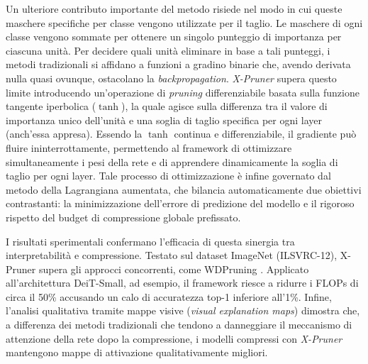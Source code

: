 Un ulteriore contributo importante del metodo risiede nel modo in cui queste maschere specifiche per classe vengono utilizzate per il taglio. Le maschere di ogni classe vengono sommate per ottenere un singolo punteggio di importanza per ciascuna unità. Per decidere quali unità eliminare in base a tali punteggi, i metodi tradizionali si affidano a funzioni a gradino binarie che, avendo derivata nulla quasi ovunque, ostacolano la \textit{backpropagation}. \textit{X-Pruner} supera questo limite introducendo un'operazione di \textit{pruning} differenziabile basata sulla funzione tangente iperbolica ($\tanh$), la quale agisce sulla differenza tra il valore di importanza unico dell'unità e una soglia di taglio specifica per ogni layer (anch'essa appresa). Essendo la $\tanh$ continua e differenziabile, il gradiente può fluire ininterrottamente, permettendo al framework di ottimizzare simultaneamente i pesi della rete e di apprendere dinamicamente la soglia di taglio per ogni layer. Tale processo di ottimizzazione è infine governato dal metodo della Lagrangiana aumentata, che bilancia automaticamente due obiettivi contrastanti: la minimizzazione dell'errore di predizione del modello e il rigoroso rispetto del budget di compressione globale prefissato. \par
I risultati sperimentali confermano l'efficacia di questa sinergia tra interpretabilità e compressione. Testato sul dataset ImageNet (ILSVRC-12), X-Pruner supera gli approcci concorrenti, come WDPruning \cite{yu2022width}. Applicato all'architettura DeiT-Small, ad esempio, il framework riesce a ridurre i FLOPs di circa il 50\% accusando un calo di accuratezza top-1 inferiore all'1\%. Infine, l'analisi qualitativa tramite mappe visive (\textit{visual explanation maps}) dimostra che, a differenza dei metodi tradizionali che tendono a danneggiare il meccanismo di attenzione della rete dopo la compressione, i modelli compressi con \textit{X-Pruner} mantengono mappe di attivazione qualitativamente migliori.
 
